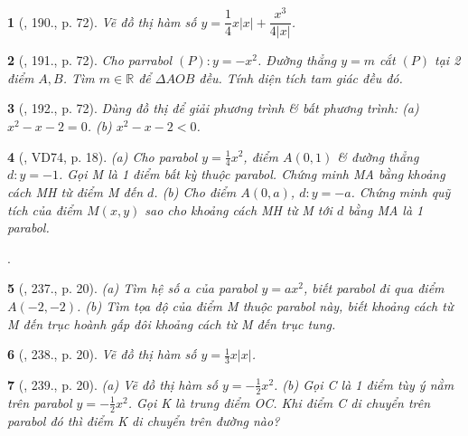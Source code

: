 \documentclass{article}
\newtheorem{baitoan}{}
\begin{document}
\begin{baitoan}[\cite{Tuyen_Toan_9_old}, 190., p. 72]
	Vẽ đồ thị hàm số $y = \dfrac{1}{4}x|x| + \dfrac{x^3}{4|x|}$.
\end{baitoan}

\begin{baitoan}[\cite{Tuyen_Toan_9_old}, 191., p. 72]
	Cho parrabol $(P):y = -x^2$. Đường thẳng $y = m$ cắt $(P)$ tại 2 điểm $A,B$. Tìm $m\in\mathbb{R}$ để $\Delta AOB$ đều. Tính diện tích tam giác đều đó.
\end{baitoan}

\begin{baitoan}[\cite{Tuyen_Toan_9_old}, 192., p. 72]
	Dùng đồ thị để giải phương trình \& bất phương trình: (a) $x^2 - x - 2 = 0$. (b) $x^2 - x - 2 < 0$.
\end{baitoan}

\begin{baitoan}[\cite{Binh_Toan_9_tap_2}, VD74, p. 18]
	(a) Cho parabol $y = \frac{1}{4}x^2$, điểm $A(0,1)$ \& đường thẳng $d:y = -1$. Gọi M là 1 điểm bất kỳ thuộc parabol. Chứng minh MA bằng khoảng cách MH từ điểm M đến $d$. (b) Cho điểm $A(0,a)$, $d:y = -a$. Chứng minh quỹ tích của điểm $M(x,y)$ sao cho khoảng cách MH từ M tới $d$ bằng MA là 1 parabol.
\end{baitoan}
\noindent\cite[235., p. 19, 236., p. 20]{Binh_Toan_9_tap_2}.

\begin{baitoan}[\cite{Binh_Toan_9_tap_2}, 237., p. 20]
	(a) Tìm hệ số $a$ của parabol $y = ax^2$, biết parabol đi qua điểm $A(-2,-2)$. (b) Tìm tọa độ của điểm M thuộc parabol này, biết khoảng cách từ M đến trục hoành gấp đôi khoảng cách từ M đến trục tung.
\end{baitoan}

\begin{baitoan}[\cite{Binh_Toan_9_tap_2}, 238., p. 20]
	Vẽ đồ thị hàm số $y = \frac{1}{3}x|x|$.
\end{baitoan}

\begin{baitoan}[\cite{Binh_Toan_9_tap_2}, 239., p. 20]
	(a) Vẽ đồ thị hàm số $y = -\frac{1}{2}x^2$. (b) Gọi C là 1 điểm tùy ý nằm trên parabol $y = -\frac{1}{2}x^2$. Gọi K là trung điểm OC. Khi điểm C di chuyển trên parabol đó thì điểm K di chuyển trên đường nào?
\end{baitoan}

\end{document}
